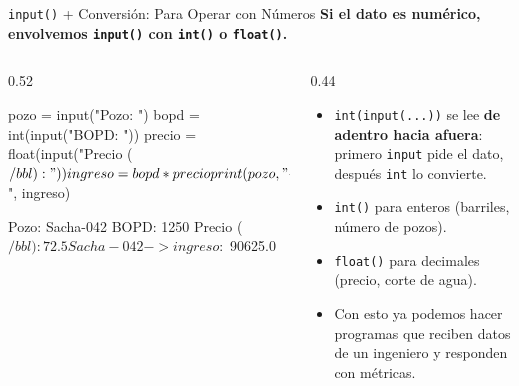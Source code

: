 \documentclass[aspectratio=169, 11pt]{beamer}
\begin{document}
\begin{frame}[fragile,shrink=25]{\texttt{input()} + Conversión: Para Operar con Números}
  \vspace{-6pt}
  {\small\color{arcaDark}\bfseries
    Si el dato es numérico, envolvemos \texttt{input()} con \texttt{int()} o \texttt{float()}.}

  \vspace{6pt}
  \begin{columns}[T]
    \begin{column}{0.52\textwidth}
      \begin{pyblock}
pozo   = input("Pozo: ")
bopd   = int(input("BOPD: "))
precio = float(input("Precio ($/bbl): "))

ingreso = bopd * precio
print(pozo, "-> ingreso: $", ingreso)
      \end{pyblock}
      \vspace{2pt}
      \begin{outputblock}
Pozo: Sacha-042
BOPD: 1250
Precio ($/bbl): 72.5
Sacha-042 -> ingreso: $ 90625.0
      \end{outputblock}
    \end{column}

    \begin{column}{0.44\textwidth}
      {\scriptsize\color{textMuted}
      \begin{itemize}\setlength{\itemsep}{4pt}
        \item[{\color{arcaRed}\scriptsize\faLayerGroup}]
          \texttt{int(input(...))} se lee \textbf{de adentro hacia afuera}:
          primero \texttt{input} pide el dato, después \texttt{int}
          lo convierte.
        \item[{\color{arcaRed}\scriptsize\faHashtag}]
          \texttt{int()} para enteros (barriles, número de pozos).
        \item[{\color{arcaRed}\scriptsize\faPercent}]
          \texttt{float()} para decimales (precio, corte de agua).
        \item[{\color{codeGreen}\scriptsize\faCheck}]
          Con esto ya podemos hacer programas que
          reciben datos de un ingeniero y responden con métricas.
      \end{itemize}
      }
    \end{column}
  \end{columns}
\end{frame}
\end{document}
